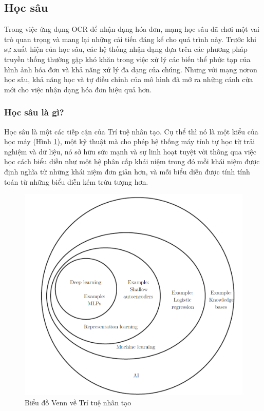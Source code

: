 \subsection{Học sâu}
Trong việc ứng dụng OCR để nhận dạng hóa đơn, mạng học sâu đã chơi một vai trò quan trọng và mang lại những cải tiến đáng kể cho quá trình này. Trước khi sự xuất hiện của học sâu, các hệ thống nhận dạng dựa trên các phương pháp truyền thống thường gặp khó khăn trong việc xử lý các biến thể phức tạp của hình ảnh hóa đơn và khả năng xử lý đa dạng của chúng. Nhưng với mạng nơron học sâu, khả năng học và tự điều chỉnh của mô hình đã mở ra những cánh cửa mới cho việc nhận dạng hóa đơn hiệu quả hơn.

\subsubsection{Học sâu là gì?}
Học sâu là một các tiếp cận của Trí tuệ nhân tạo. Cụ thể thì nó là một kiểu của học máy (Hình \ref{fig:venn1}), một kỹ thuật mà cho phép hệ thống máy tính tự học từ trải nghiệm và dữ liệu, nó sở hữu sức mạnh và sự linh hoạt tuyệt vời thông qua việc học cách biểu diễn như một hệ phân cấp khái niệm trong đó mỗi khái niệm được định nghĩa từ những khái niệm đơn giản hơn, và mỗi biểu diễn được tính tính toán từ những biểu diễn kém trừu tượng hơn. \cite{Goodfellow-et-al-2016}

\begin{figure}
    \includegraphics[scale=0.45]{images/venn_diagram_deeplearning.png}
    \centering
    \caption{Biểu đồ Venn về Trí tuệ nhân tạo}
    \label{fig:venn1}
\end{figure}


